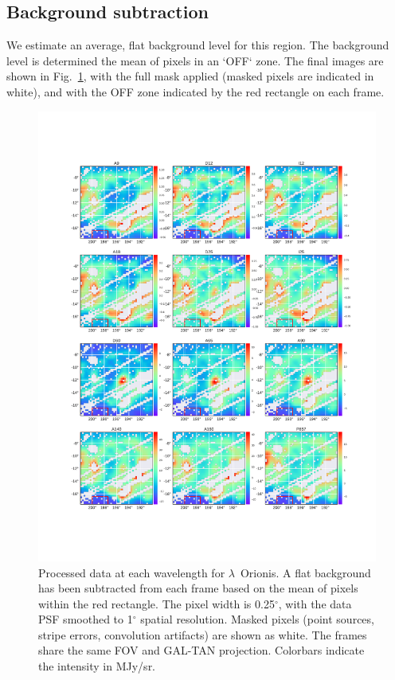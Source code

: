      \subsection{Background subtraction}
         We estimate an average, flat background level for this region. The background level is determined the mean of pixels in an `OFF` zone. The final images are shown in Fig.~\ref{fig:lori_processed_all}, with the full mask applied (masked pixels are indicated in white), and with the OFF zone indicated by the red rectangle on each frame.
            \begin{figure}
              \includegraphics[width=\textwidth,trim={5cm 5cm 3.5cm 5cm},clip]{../Plots/ch_lori/lori_processed_grid.pdf}
              \centering
              \caption{Processed data at each wavelength for $\lambda$~Orionis. A flat background has been subtracted from each frame based on the mean of pixels within the red rectangle. The pixel width is 0.25$^{\circ}$, with the data PSF smoothed to 1$^{\circ}$ spatial resolution. Masked pixels (point sources, stripe errors, convolution artifacts) are shown as white. The frames share the same FOV and GAL-TAN projection. Colorbars indicate the intensity in MJy/sr.}
              \label{fig:lori_processed_all}
            \end{figure}
